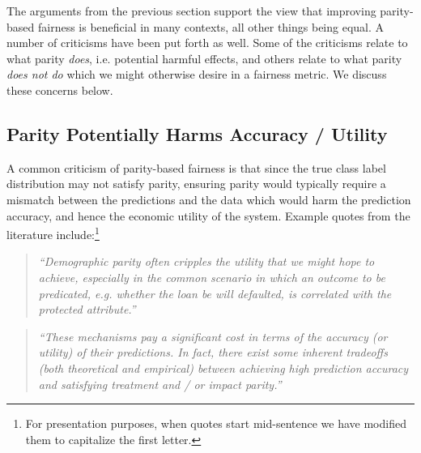 \documentclass[11pt,dvipdfm]{article}
\begin{document}

The arguments from the previous section support the view that improving parity-based fairness is beneficial in many contexts, all other things being equal.  A number of criticisms have been put forth as well.  Some of the criticisms relate to what parity \emph{does}, i.e. potential harmful effects, and others relate to what parity \emph{does not do} which we might otherwise desire in a fairness metric. We discuss these concerns below.


\subsection{Parity Potentially Harms Accuracy / Utility}
A common criticism of parity-based fairness is that since the true class label distribution may not satisfy parity, ensuring parity would typically require a mismatch between the predictions and the data which would harm the prediction accuracy, and hence the economic utility of the system.  Example quotes from the literature include:\footnote{For presentation purposes, when quotes start mid-sentence we have modified them to capitalize the first letter.}
\begin{quote}
 \emph{``Demographic parity often cripples the utility that we might hope to achieve, especially in the common scenario in which an outcome to be predicated, e.g. whether the loan be will defaulted, is correlated with the protected attribute.''} \cite{hardt2016equality}
\end{quote}

\begin{quote}
\emph{``These mechanisms pay a significant cost in terms of the accuracy (or utility) of their predictions. In fact, there exist some inherent tradeoffs (both theoretical and empirical) between achieving high prediction accuracy and satisfying treatment and / or impact parity.''} \cite{zafar2017parity}
\end{quote}
\end{document}
